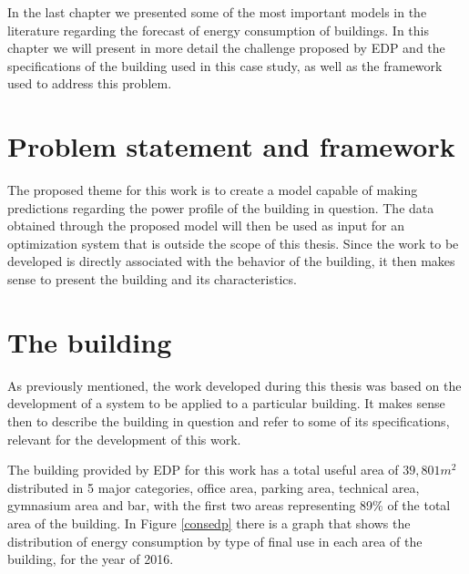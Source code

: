 \cleardoublepage
\label{chap:architecture}


In the last chapter we presented some of the most important models in the literature regarding the forecast of energy consumption of buildings. In this chapter we will present in more detail the challenge proposed by \ac{EDP} and the specifications of the building used in this case study, as well as the framework used to address this problem.

\section{Problem statement and framework}

The proposed theme for this work is to create a model capable of making predictions regarding the power profile of the building in question. The data obtained through the proposed model will then be used as input for an optimization system that is outside the scope of this thesis. Since the work to be developed is directly associated with the behavior of the building, it then makes sense to present the building and its characteristics.



\section{The building}\label{subbuild}

As previously mentioned, the work developed during this thesis was based on the development of a system to be applied to a particular building. It makes sense then to describe the building in question and refer to some of its specifications, relevant for the development of this work.

The building provided by \ac{EDP} for this work has a total useful area of $39,801m^2$ distributed in 5 major categories, office area, parking area, technical area, gymnasium area and bar, with the first two areas representing 89\% of the total area of the building. In Figure \ref{consedp} there is a graph that shows the distribution of energy consumption by type of final use in each area of the building, for the year of 2016.

